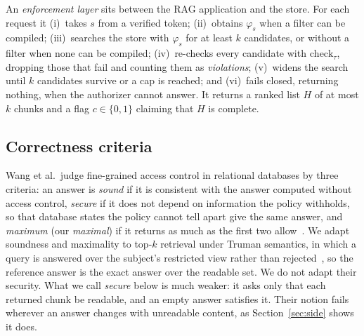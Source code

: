 An \emph{enforcement layer} sits between the RAG application and the store. For each request it
(i)~takes $s$ from a verified token; (ii)~obtains $\varphi_s$ when a filter can be compiled;
(iii)~searches the store with $\varphi_s$ for at least $k$ candidates, or without a filter when none
can be compiled; (iv)~re-checks every candidate with $\mathrm{check}_\tau$, dropping those that fail
and counting them as \emph{violations}; (v)~widens the search until $k$ candidates survive or a cap is
reached; and (vi)~fails closed, returning nothing, when the authorizer cannot answer. It returns a
ranked list $H$ of at most $k$ chunks and a flag $c \in \{0,1\}$ claiming that $H$ is complete.

\subsection{Correctness criteria}\label{sec:prob-criteria}

Wang et al.\ judge fine-grained access control in relational databases by three criteria: an answer
is \emph{sound} if it is consistent with the answer computed without access control, \emph{secure}
if it does not depend on information the policy withholds, so that database states the policy cannot
tell apart give the same answer, and \emph{maximum} (our \emph{maximal}) if it returns as much as the first two
allow~\cite{wang2007correctness}. We adapt soundness and maximality to top-$k$ retrieval under Truman semantics, in which a
query is answered over the subject's restricted view rather than rejected~\cite{rizvi2004extending}, so
the reference answer is the exact answer over the readable set. We do not adapt their security. What we call
\emph{secure} below is much weaker: it asks only that each returned chunk be readable, and an empty answer satisfies it.
Their notion fails wherever an answer changes with unreadable content, as Section~\ref{sec:side} shows it does.

